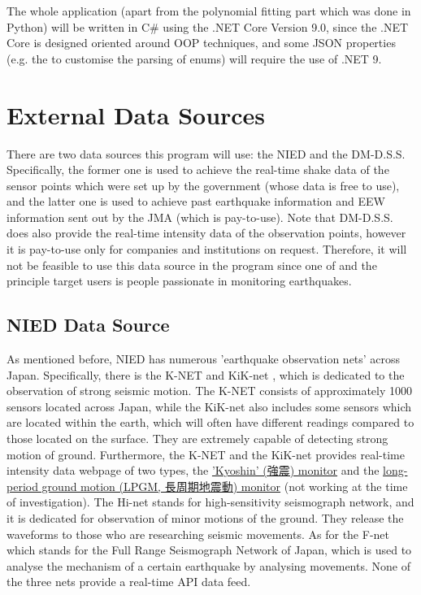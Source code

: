 The whole application (apart from the polynomial fitting part which was done in Python) will be written in C\# using the .NET Core Version 9.0, since the .NET Core is designed oriented around OOP techniques, and some JSON properties (e.g. the  to customise the parsing of enums) will require the use of .NET 9.

\section{External Data Sources}
There are two data sources this program will use: the NIED and the DM-D.S.S. Specifically, the former one is used to achieve the real-time shake data of the sensor points which were set up by the government (whose data is free to use), and the latter one is used to achieve past earthquake information and EEW information sent out by the JMA (which is pay-to-use). Note that DM-D.S.S. does also provide the real-time intensity data of the observation points, however it is pay-to-use only for companies and institutions on request. Therefore, it will not be feasible to use this data source in the program since one of and the principle target users is people passionate in monitoring earthquakes.

\subsection{NIED Data Source}

As mentioned before, NIED has numerous 'earthquake observation nets' across Japan. Specifically, there is the K-NET and KiK-net \autocite{nied-k-kik-net}, which is dedicated to the observation of strong seismic motion. The K-NET consists of approximately 1000 sensors located across Japan, while the KiK-net also includes some sensors which are located within the earth, which will often have different readings compared to those located on the surface. They are extremely capable of detecting strong motion of ground. Furthermore, the K-NET and the KiK-net provides real-time intensity data webpage of two types, the \href{http://www.kmoni.bosai.go.jp}{'Kyoshin' (強震) monitor} and the \href{https://www.lmoni.bosai.go.jp/monitor/}{long-period ground motion (LPGM, 長周期地震動) monitor} (not working at the time of investigation). The Hi-net \autocite{nied-hi-net} stands for high-sensitivity seismograph network, and it is dedicated for observation of minor motions of the ground. They release the waveforms to those who are researching seismic movements. As for the F-net \autocite{nied-f-net} which stands for the Full Range Seismograph Network of Japan, which is used to analyse the mechanism of a certain earthquake by analysing movements. None of the three nets provide a real-time API data feed.

